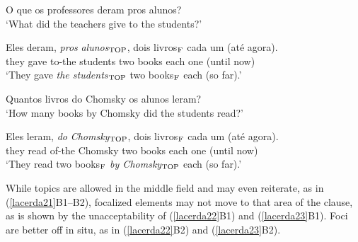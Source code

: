 \documentclass[output=paper]{langscibook}
\begin{document}
\begin{exe}
\ex \label{lacerda19}
\begin{xlist}
 \label{lacerda19a}
O que os professores deram pros alunos?\\
‘What did the teachers give to the students?’

 \label{lacerda19B}
\gll Eles 	deram, 	\emph{pros} 	\emph{alunos$_{\textnormal{TOP}}$}, 	dois 	livros$_{\textnormal{F}}$ 	cada 	um 	(até 	agora).\\
they 	gave 	to-the 	students 	two 	books 	each 	one 	(until 	now)\\
\glt‘They gave \emph{the students$_{\textnormal{TOP}}$} two books$_{\textnormal{F}}$ each (so far).’

\end{xlist}

\ex \label{lacerda20}
\begin{xlist}
 \label{lacerda20A}
Quantos livros do Chomsky os alunos leram?\\
‘How many books by Chomsky did the students read?’

 \label{lacerda20B}
\gll Eles 	leram, 	\emph{do} 	\emph{Chomsky}$_{\textnormal{TOP}}$, 	dois 	livros$_{\textnormal{F}}$ 	cada 	um 	(até 	agora).\\
they 	read 	of-the 	Chomsky 	two 	books 	each 	one 	(until 	now)\\
\glt‘They read two books$_{\textnormal{F}}$ \emph{by Chomsky$_{\textnormal{TOP}}$} each (so far).’
\end{xlist}

\end{exe}

While topics are allowed in the middle field and may even reiterate, as in (\ref{lacerda21}B1--B2), focalized elements may not move to that area of the clause, as is shown by the unacceptability of (\ref{lacerda22}B1) and (\ref{lacerda23}B1). Foci are better off in situ, as in (\ref{lacerda22}B2) and (\ref{lacerda23}B2).
\end{document}
